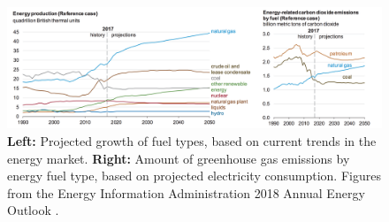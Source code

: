 \begin{figure}
\centering
\includegraphics[width=\textwidth]{figures/greenhouse_gas_energy_type.png}	
	\caption{\textbf{Left:} Projected growth of fuel types, based on current trends in the energy market.  \textbf{Right:} Amount of greenhouse gas emissions by energy fuel type, based on projected electricity consumption.  Figures from the Energy Information Administration 2018 Annual Energy Outlook \cite{eia_eo}.}	
\label{fig:ghg}
\end{figure}







